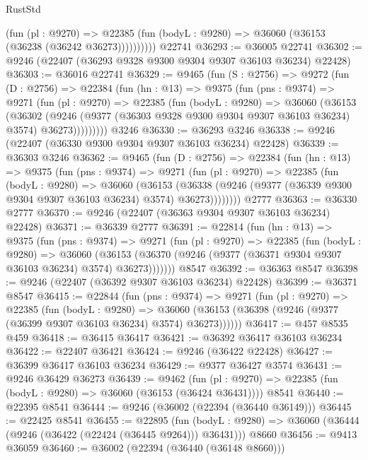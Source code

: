 \begin{lexlean}{RustStd}
\begin{coremodule}
              (fun (pl : @9270) =>
              @22385 (fun (bodyL : @9280) => @36060 (@36153 (@36238 (@36242 @36273))))))))))
    @22741
@36293 := @36005 @22741
@36302 := @9246 (@22407 (@36293 @9328 @9300 @9304 @9307 @36103 @36234) @22428)
@36303 := @36016 @22741
@36329 := @9465
    (fun (S : @2756) =>
    @9272
      (fun (D : @2756) =>
      @22384
        (fun (hn : @13) =>
        @9375
          (fun (pns : @9374) =>
          @9271
            (fun (pl : @9270) =>
            @22385
              (fun (bodyL : @9280) =>
              @36060
                (@36153
                  (@36302
                    (@9246
                      (@9377 (@36303 @9328 @9300 @9304 @9307 @36103 @36234) @3574)
                      @36273)))))))))
    @3246
@36330 := @36293 @3246
@36338 := @9246 (@22407 (@36330 @9300 @9304 @9307 @36103 @36234) @22428)
@36339 := @36303 @3246
@36362 := @9465
    (fun (D : @2756) =>
    @22384
      (fun (hn : @13) =>
      @9375
        (fun (pns : @9374) =>
        @9271
          (fun (pl : @9270) =>
          @22385
            (fun (bodyL : @9280) =>
            @36060
              (@36153
                (@36338 (@9246 (@9377 (@36339 @9300 @9304 @9307 @36103 @36234) @3574) @36273))))))))
    @2777
@36363 := @36330 @2777
@36370 := @9246 (@22407 (@36363 @9304 @9307 @36103 @36234) @22428)
@36371 := @36339 @2777
@36391 := @22814
    (fun (hn : @13) =>
    @9375
      (fun (pns : @9374) =>
      @9271
        (fun (pl : @9270) =>
        @22385
          (fun (bodyL : @9280) =>
          @36060
            (@36153 (@36370 (@9246 (@9377 (@36371 @9304 @9307 @36103 @36234) @3574) @36273)))))))
    @8547
@36392 := @36363 @8547
@36398 := @9246 (@22407 (@36392 @9307 @36103 @36234) @22428)
@36399 := @36371 @8547
@36415 := @22844
    (fun (pns : @9374) =>
    @9271
      (fun (pl : @9270) =>
      @22385
        (fun (bodyL : @9280) =>
        @36060 (@36153 (@36398 (@9246 (@9377 (@36399 @9307 @36103 @36234) @3574) @36273))))))
@36417 := @457 @8535 @459
@36418 := @36415 @36417
@36421 := @36392 @36417 @36103 @36234
@36422 := @22407 @36421
@36424 := @9246 (@36422 @22428)
@36427 := @36399 @36417 @36103 @36234
@36429 := @9377 @36427 @3574
@36431 := @9246 @36429 @36273
@36439 := @9462
    (fun (pl : @9270) => @22385 (fun (bodyL : @9280) => @36060 (@36153 (@36424 @36431))))
    @8541
@36440 := @22395 @8541
@36444 := @9246 (@36002 (@22394 (@36440 @36149)))
@36445 := @22425 @8541
@36455 := @22895
    (fun (bodyL : @9280) => @36060 (@36444 (@9246 (@36422 (@22424 (@36445 @9264))) @36431)))
    @8660
@36456 := @9413 @36059
@36460 := @36002 (@22394 (@36440 (@36148 @8660)))

\end{coremodule}
\end{lexlean}
